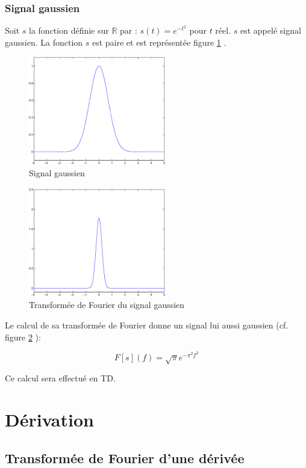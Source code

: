 \subsubsection{Signal gaussien}
Soit $s$ la fonction définie sur $\mathbb{R}$ par : $s(t)=e^{-t^2}$ pour $t$ réel. $s$ est appelé signal gaussien. La fonction $s$ est paire et est représentée figure \ref{gauss} .
\begin{figure}[htbp]
\centerline{
\includegraphics[width=6cm]{gauss.eps}}
\caption{Signal gaussien}
\label{gauss}
\end{figure}
\begin{figure}[htbp]
\centerline{
\includegraphics[width=6cm]{gaussfou.eps}}
\caption{Transformée de Fourier du signal gaussien}
\label{gaussfou}
\end{figure}

Le calcul de sa transformée de Fourier donne un signal lui aussi gaussien (cf. figure \ref{gaussfou} ):

$$F[s](f)=\sqrt{\pi}e^{-\pi^2f^2}$$

Ce calcul sera effectué en TD.


\section{Dérivation}

\subsection{Transformée de Fourier d'une dérivée}

